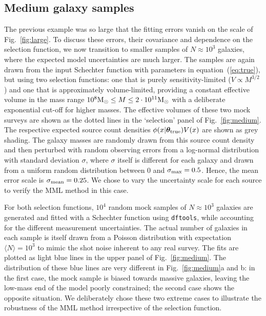 \documentclass[a4paper,fleqn,usenatbib]{mnras}
\newcommand{\msun}{{\rm M}_{\odot}}
\newcommand{\dftools}{\texttt{dftools}\xspace}
\newcommand{\veff}{V}%
\newcommand{\fig}[1]{Fig.~\ref{fig:#1}}
\newcommand{\eq}[1]{equation~(\ref{eq:#1})}
\newcommand{\para}{{\bm{\theta}}}
\begin{document}
\subsection{Medium galaxy samples}\label{ss:medium}

The previous example was so large that the fitting errors vanish on the scale of \fig{large}. To discuss these errors, their covariance and dependence on the selection function, we now transition to smaller samples of $N\approx10^3$ galaxies, where the expected model uncertainties are much larger. The samples are again drawn from the input Schechter function with parameters in \eq{true}, but using two selection functions: one that is purely sensitivity-limited ($\veff\propto M^{3/2}$) and one that is approximately volume-limited, providing a constant effective volume in the mass range $10^8\msun\leq M\leq2\cdot10^{11}\msun$ with a deliberate exponential cut-off for higher masses. The effective volumes of these two mock surveys are shown as the dotted lines in the `selection' panel of \fig{medium}. The respective expected source count densities $\phi(x|\para_{\rm true})\veff(x)$ are shown as grey shading. The galaxy masses are randomly drawn from this source count density and then perturbed with random observing errors from a log-normal distribution with standard deviation $\sigma$, where $\sigma$ itself is different for each galaxy and drawn from a uniform random distribution between 0 and $\sigma_{\rm max}=0.5$. Hence, the mean error scale is $\sigma_{\rm mean}=0.25$. We chose to vary the uncertainty scale for each source to verify the MML method in this case.

For both selection functions, $10^4$ random mock samples of $N\approx10^3$ galaxies are generated and fitted with a Schechter function using \dftools, while accounting for the different measurement uncertainties. The actual number of galaxies in each sample is itself drawn from a Poisson distribution with expectation $\langle N\rangle=10^3$ to mimic the shot noise inherent to any real survey. The fits are plotted as light blue lines in the upper panel of \fig{medium}. The distribution of these blue lines are very different in \fig{medium}a and b: in the first case, the mock sample is biased towards massive galaxies, leaving the low-mass end of the model poorly constrained; the second case shows the opposite situation. We deliberately chose these two extreme cases to illustrate the robustness of the MML method irrespective of the selection function.
\end{document}
